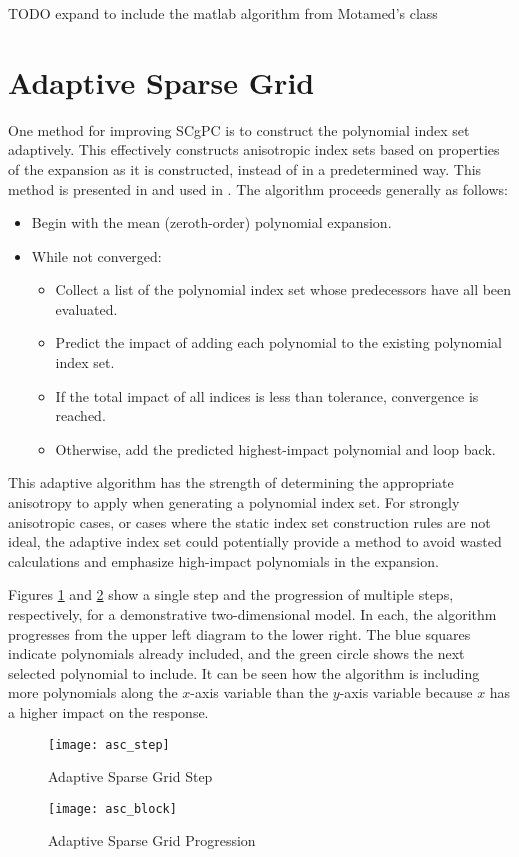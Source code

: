 TODO expand to include the matlab algorithm from Motamed's class


\section{Adaptive Sparse Grid}\label{sec:adaptive sparse grid}
One method for improving SCgPC is to construct the polynomial index set adaptively.  This effectively
constructs anisotropic index sets based on properties of the expansion as it is constructed, instead of in a
predetermined way.  This method is presented in \cite{Gerstner} and used in \cite{Ayres}.  The algorithm
proceeds generally as follows:
\begin{itemize}
  \item Begin with the mean (zeroth-order) polynomial expansion.
  \item While not converged:
    \begin{itemize}
      \item Collect a list of the polynomial index set whose predecessors have all been evaluated.
      \item Predict the impact of adding each polynomial to the existing polynomial index set.
      \item If the total impact of all indices is less than tolerance, convergence is reached.
      \item Otherwise, add the predicted highest-impact polynomial and loop back.
    \end{itemize}
\end{itemize}
This adaptive algorithm has the strength of determining the appropriate anisotropy to apply when generating a
polynomial index set.  For strongly  anisotropic cases, or cases where the static index set construction rules are not
ideal, the adaptive index set could potentially provide a method to avoid wasted calculations and emphasize
high-impact polynomials in the expansion.

Figures \ref{fig:asg step} and \ref{fig:asg block} show a single
step and the progression of multiple steps, respectively, for a demonstrative two-dimensional model.  In each, 
the algorithm progresses from the upper
left diagram to the lower right.  The blue squares indicate polynomials already included, and the green circle
shows the next selected polynomial to include.  It can be seen how the algorithm is including more polynomials
along the $x$-axis variable than the $y$-axis variable because $x$ has a higher impact on the response.
\begin{figure}[H]
  \centering
  \texttt{[image: asc\_step]}
  \caption{Adaptive Sparse Grid Step}
  \label{fig:asg step}
\end{figure}
\begin{figure}[H]
  \centering
  \texttt{[image: asc\_block]}
  \caption{Adaptive Sparse Grid Progression}
  \label{fig:asg block}
\end{figure}

